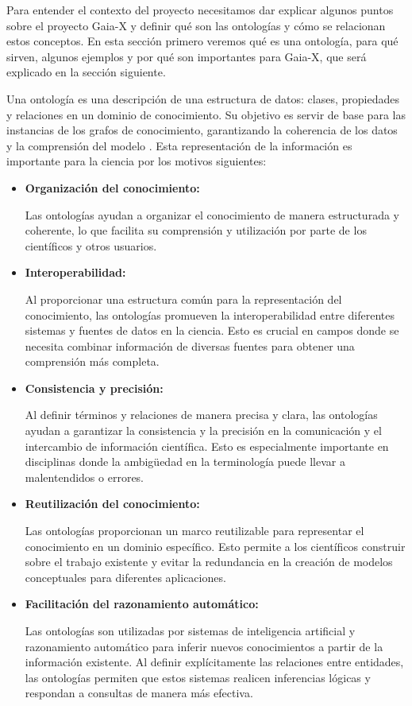 Para entender el contexto del proyecto necesitamos dar explicar algunos puntos sobre el proyecto Gaia-X y definir qué son las ontologías y cómo se relacionan estos conceptos. En esta sección primero veremos qué es una ontología, para qué sirven, algunos ejemplos y por qué son importantes para Gaia-X, que será explicado en la sección siguiente.

Una ontología es una descripción de una estructura de datos: clases, propiedades y relaciones en un dominio de conocimiento. Su objetivo es servir de base para las instancias de los grafos de conocimiento, garantizando la coherencia de los datos y la comprensión del modelo \cite[]{Ontology}.
Esta representación de la información es importante para la ciencia por los motivos siguientes:
\begin{itemize}
   \item \textbf{Organización del conocimiento:}
   
   Las ontologías ayudan a organizar el conocimiento de manera estructurada y coherente, lo que facilita su comprensión y utilización por parte de los científicos y otros usuarios.

   \item \textbf{Interoperabilidad:}
   
   Al proporcionar una estructura común para la representación del conocimiento, las ontologías promueven la interoperabilidad entre diferentes sistemas y fuentes de datos en la ciencia. Esto es crucial en campos donde se necesita combinar información de diversas fuentes para obtener una comprensión más completa.
   
   \item \textbf{Consistencia y precisión:}
   
   Al definir términos y relaciones de manera precisa y clara, las ontologías ayudan a garantizar la consistencia y la precisión en la comunicación y el intercambio de información científica. Esto es especialmente importante en disciplinas donde la ambigüedad en la terminología puede llevar a malentendidos o errores.
   
   \item \textbf{Reutilización del conocimiento:}
   
   Las ontologías proporcionan un marco reutilizable para representar el conocimiento en un dominio específico. Esto permite a los científicos construir sobre el trabajo existente y evitar la redundancia en la creación de modelos conceptuales para diferentes aplicaciones.
   
   \item \textbf{Facilitación del razonamiento automático:}
   
   Las ontologías son utilizadas por sistemas de inteligencia artificial y razonamiento automático para inferir nuevos conocimientos a partir de la información existente. Al definir explícitamente las relaciones entre entidades, las ontologías permiten que estos sistemas realicen inferencias lógicas y respondan a consultas de manera más efectiva.
\end{itemize}

